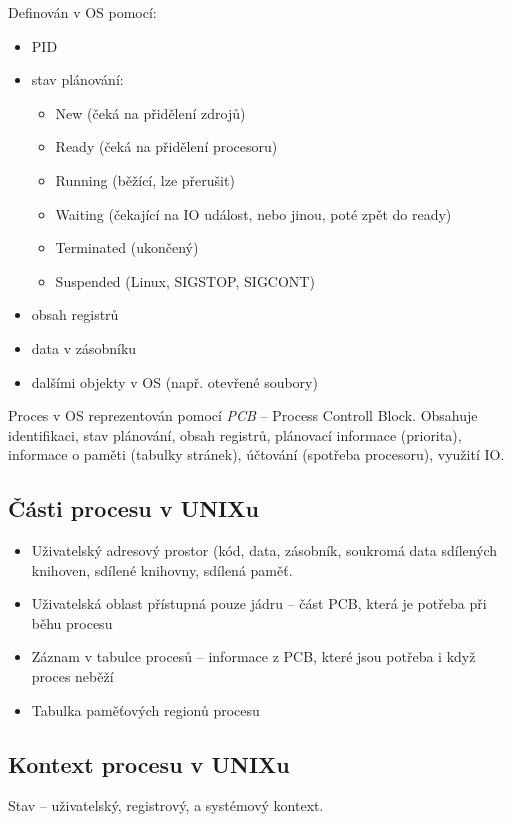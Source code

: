 \documentclass[a4wide]{report}
\begin{document}
Definován v OS pomocí:
\begin{itemize}
	\item PID
	\item stav plánování:
	\begin{itemize}
		\item New (čeká na přidělení zdrojů)
		\item Ready (čeká na přidělení procesoru)
		\item Running (běžící, lze přerušit)
		\item Waiting (čekající na IO událost, nebo jinou, poté zpět do ready)
		\item Terminated (ukončený)
		\item Suspended (Linux, SIGSTOP, SIGCONT)
	\end{itemize}

	\item obsah registrů
	\item data v zásobníku
	\item dalšími objekty v OS (např. otevřené soubory)
\end{itemize}

Proces v OS reprezentován pomocí \emph{PCB} -- Process Controll Block. Obsahuje identifikaci, stav plánování, obsah registrů, plánovací informace (priorita), informace o paměti (tabulky stránek), účtování (spotřeba procesoru), využití IO.

\subsection{Části procesu v UNIXu}

\begin{itemize}
	\item Uživatelský adresový prostor (kód, data, zásobník, soukromá data sdílených knihoven, sdílené knihovny, sdílená paměť.
	\item Uživatelská oblast přístupná pouze jádru -- část PCB, která je potřeba při běhu procesu
	\item Záznam v tabulce procesů -- informace z PCB, které jsou potřeba i když proces neběží
	\item Tabulka paměťových regionů procesu
\end{itemize}

\subsection{Kontext procesu v UNIXu}
Stav -- uživatelský, registrový, a systémový kontext.
\end{document}
